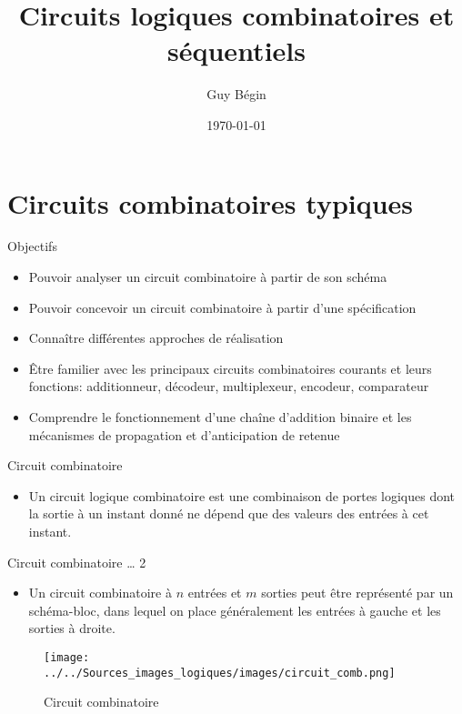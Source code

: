 \documentclass[presentation]{beamer}
\author{Guy Bégin}
\date{\today}
\title{Circuits logiques combinatoires et séquentiels}
\begin{document}
\maketitle

\section{Circuits combinatoires typiques}
\label{sec:org6a74347}

\begin{frame}[label={sec:org2759d9b}]{Objectifs}
\begin{itemize}
\item Pouvoir analyser un circuit combinatoire à partir de son schéma
\item Pouvoir concevoir un circuit combinatoire à partir d'une spécification
\item Connaître différentes approches de réalisation
\item Être familier avec les principaux circuits combinatoires courants et
leurs fonctions: additionneur, décodeur, multiplexeur, encodeur,
comparateur
\item Comprendre le fonctionnement d'une chaîne d'addition binaire et les
mécanismes de propagation et d'anticipation de retenue
\end{itemize}
\end{frame}

\begin{frame}[label={sec:orgdd130a5}]{Circuit combinatoire}
\begin{itemize}
\item Un circuit logique combinatoire est une combinaison de portes logiques dont la sortie à un instant donné ne dépend que des valeurs des entrées à cet instant.
\end{itemize}
\end{frame}

\begin{frame}[label={sec:orgaa64f16}]{Circuit combinatoire \ldots{} 2}
\begin{itemize}
\item Un circuit combinatoire à \(n\) entrées et \(m\) sorties peut être représenté par un schéma-bloc, dans lequel on place généralement les entrées à gauche et les sorties à droite.
\end{itemize}

\begin{figure}[htbp]
\centering
\texttt{[image: ../../Sources\_images\_logiques/images/circuit\_comb.png]}
\caption{\label{fig:org75c055c}Circuit combinatoire}
\end{figure}
\end{frame}
\end{document}
